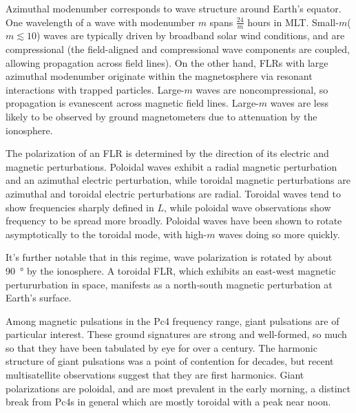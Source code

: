 \documentclass{article}
\newcommand{\azm}{\ensuremath{m}\xspace}
\begin{document}
Azimuthal modenumber corresponds to wave structure around Earth's equator. One wavelength of a wave with modenumber \azm spans $\frac{24}{\azm}$ hours in MLT. Small-\azm ($\azm \lesssim 10$) waves are typically driven by broadband solar wind conditions\cite{degeling_2014,hao_2014,zong_2009,chen_1974,liu_2011,southwood_1974}, and are compressional (the field-aligned and compressional wave components are coupled, allowing propagation across field lines). On the other hand, FLRs with large azimuthal modenumber originate within the magnetosphere via resonant interactions with trapped particles. Large-\azm waves are noncompressional, so propagation is evanescent across magnetic field lines\cite{cummings_1969,radoski_1974}. Large-\azm waves are less likely to be observed by ground magnetometers due to attenuation by the ionosphere\cite{hughes_1976,wright_1999,yeoman_2001}.

The polarization of an FLR is determined by the direction of its electric and magnetic perturbations. Poloidal waves exhibit a radial magnetic perturbation and an azimuthal electric perturbation, while toroidal magnetic perturbations are azimuthal and toroidal electric perturbations are radial. Toroidal waves tend to show frequencies sharply defined in $L$, while poloidal wave observations show frequency to be spread more broadly\cite{engebretson_1986}. Poloidal waves have been shown to rotate asymptotically to the toroidal mode, with high-\azm waves doing so more quickly\cite{mann_1995,mann_1997,radoski_1974}.

It's further notable that in this regime, wave polarization is rotated by about \SI{90}{\degree} by the ionosphere\cite{nishida_1964_screening}. A toroidal FLR, which exhibits an east-west magnetic pertururbation in space, manifests as a north-south magnetic perturbation at Earth's surface.

Among magnetic pulsations in the Pc4 frequency range, giant pulsations are of particular interest. These ground signatures are strong and well-formed, so much so that they have been tabulated by eye for over a century\cite{birkeland_1901}. The harmonic structure of giant pulsations was a point of contention for decades, but recent multisatellite observations suggest that they are first harmonics\cite{glassmeier_1999,hillebrand_1982,kokubun_1989,takahashi_2011}. Giant polarizations are poloidal, and are most prevalent in the early morning\cite{chisham_1991,glassmeier_1980,rostoker_1979}, a distinct break from Pc4s in general which are mostly toroidal with a peak near noon\cite{anderson_1990}.
\end{document}
